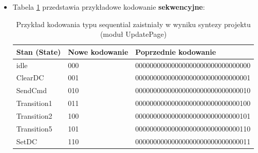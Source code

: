 \documentclass[12pt] {article}
\begin{document}
\begin{itemize}
\item Tabela \ref{table:seq} przedstawia przykładowe kodowanie \textbf{sekwencyjne}:
\begin{table}[H]
\centering
\caption{Przykład kodowania typu sequential zaistniały w wyniku syntezy projektu (moduł UpdatePage)}
\begin{tabular}{@{}lll@{}} \\
\toprule
\rowcolor[HTML]{DAE8FC} 
\textbf{Stan (State)} & \textbf{Nowe kodowanie} & \textbf{Poprzednie kodowanie}    \\ \midrule
idle                  & 000                     & 00000000000000000000000000000000 \\
ClearDC               & 001                     & 00000000000000000000000000000001 \\
SendCmd               & 010                     & 00000000000000000000000000000010 \\
Transition1           & 011                     & 00000000000000000000000000000100 \\
Transition2           & 100                     & 00000000000000000000000000000101 \\
Transition5           & 101                     & 00000000000000000000000000000110 \\
SetDC                 & 110                     & 00000000000000000000000000000011 \\
\bottomrule  
\end{tabular}
\label{table:seq}
\end{table}
\end{itemize}
\end{document}
